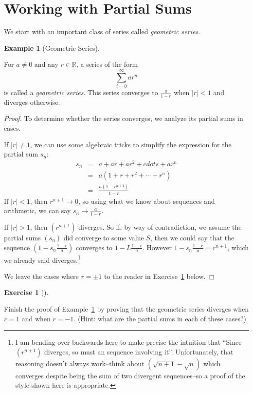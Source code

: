 \documentclass[
  letterpaper,
  DIV=11,
  numbers=noendperiod]{scrreprt}
\theoremstyle{plain}
\theoremstyle{definition}
\newtheorem{exercise}{Exercise}[chapter]
\theoremstyle{plain}
\theoremstyle{plain}
\theoremstyle{definition}
\newtheorem{example}{Example}[chapter]
\theoremstyle{definition}
\theoremstyle{remark}
\begin{document}
\section{Working with Partial Sums}\label{working-with-partial-sums}

We start with an important class of series called \emph{geometric
series}.

\begin{example}[Geometric
Series]\protect\hypertarget{exm-geometric}{}\label{exm-geometric}

For \(a\neq 0\) and any \(r\in\mathbb{R}\), a series of the form
\[\sum_{i=0}^\infty ar^n\] is called a \emph{geometric series}. This
series converges to \(\frac{a}{1-r}\) when \(|r|<1\) and diverges
otherwise.

\end{example}

\begin{proof}
To determine whether the series converges, we analyze its partial sums
in cases.

If \(|r|\neq1\), we can use some algebraic tricks to simplify the
expression for the partial sum \(s_n\): \[\begin{array}{rcl}
  s_n&=&a+ar+ar^2+cdots+ar^n\\
  &=&a(1+r+r^2+\cdots+r^n)\\
  &=&\displaystyle\frac{a(1-r^{n+1})}{1-r}
\end{array}\] If \(|r|<1\), then \(r^{n+1}\rightarrow0\), so using what
we know about sequences and arithmetic, we can say
\(s_n\rightarrow\frac{a}{1-r}\).

If \(|r|>1\), then \((r^{n+1})\) diverges. So if, by way of
contradiction, we assume the partial sums \((s_n)\) did converge to some
value \(S\), then we could say that the sequence
\(\left(1-s_n\frac{1-r}{a}\right)\) converges to \(1-L\frac{1-r}{a}\).
However \(1-s_n\frac{1-r}{a}=r^{n+1}\), which we already said
diverges.\footnote{I am bending over backwards here to make precise the
  intuition that ``Since \((r^{n+1})\) diverges, so must an sequence
  involving it''. Unfortunately, that reasoning doesn't always
  work--think about \((\sqrt{n+1} - \sqrt{n})\) which converges despite
  being the sum of two divergent sequences--so a proof of the style
  shown here is appropriate.}

We leave the cases where \(r=\pm1\) to the reader in
Exercise~\ref{exr-geometric-with-r-pm1} below.
\end{proof}

\begin{exercise}[]\protect\hypertarget{exr-geometric-with-r-pm1}{}\label{exr-geometric-with-r-pm1}

Finish the proof of Example~\ref{exm-geometric} by proving that the
geometric series diverges when \(r=1\) and when \(r=-1\). (Hint: what
are the partial sums in each of these cases?)

\end{exercise}
\end{document}
